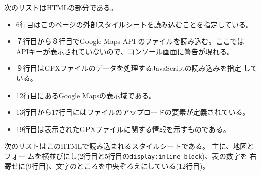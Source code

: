  次のリストはHTMLの部分である。
 \begin{itemize}
	\item 6行目はこのページの外部スタイルシートを読み込むことを指定している。
	\item ７行目から８行目でGoogle Maps API のファイルを読み込む。ここでは
				APIキーが表示されていないので、コンソール画面に警告が現れる。
	\item ９行目はGPXファイルのデータを処理するJavaScriptの読み込みを指定
				している。
	\item 12行目にあるGoogle Mapsの表示域である。
	\item 13行目から17行目にはファイルのアップロードの要素が定義されている。
	\item 19行目は表示されたGPXファイルに関する情報を示すものである。
 \end{itemize}
 次のリストはこのHTMLで読み込まれるスタイルシートである。
 主に、地図とフォー
 ムを横並びにし(2行目と5行目の\texttt{display:inline-block})、表の数字を
 右寄せに(9行目)、文字のところを中央ぞろえにしている(12行目)。

